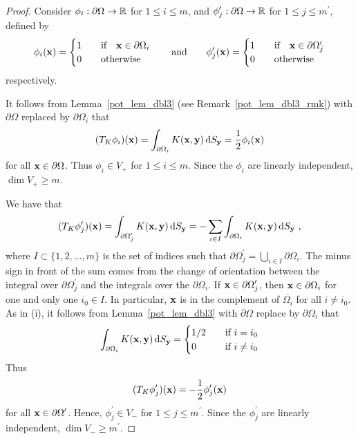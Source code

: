 \begin{proof}
Consider $\phi_i : \partial \Omega \rightarrow \mathbb{R}$ for $1\leq i \leq m$, and
$\displaystyle \phi_j^{\prime} : \partial \Omega \rightarrow \mathbb{R}$ for
$\displaystyle 1\leq j \leq m^{\prime}$, defined by
\begin{equation} \label{pot_phiI_phiJc}
\phi_i(\mathbf{x}) =
\begin{cases}
1 & \quad \text{if} \quad \mathbf{x} \in \partial \Omega_i \\
0 & \quad \text{otherwise}
\end{cases}
\qquad \text{and} \qquad
\phi_j^{\prime}(\mathbf{x}) =
\begin{cases}
1 & \quad \text{if} \quad \mathbf{x} \in \partial \Omega_j^{\prime} \\
0 & \quad \text{otherwise}
\end{cases}
\end{equation}
respectively.

 It follows from Lemma~\ref{pot_lem_dbl3} (see
Remark~\ref{pot_lem_dbl3_rmk}) with
$\partial \Omega$ replaced by $\partial \Omega_i$ that
\[
(T_K \phi_i)(\mathbf{x}) = \int_{\partial \Omega_i} K(\mathbf{x},\mathbf{y})
\,\mathrm{d}{S}_{\mathbf{y}} = \frac{1}{2} \phi_i(\mathbf{x})
\]
for all $\mathbf{x} \in \partial \Omega$.
Thus $\phi_i \in V_+$ for $1 \leq i \leq m$.  Since the $\phi_i$
are linearly independent, $\dim V_+ \geq m$.

 We have that
\[
(T_K \phi_j^{\prime})(\mathbf{x})
= \int_{\partial \Omega_j^{\prime}} K(\mathbf{x},\mathbf{y}) \,\mathrm{d}{S}_{\mathbf{y}}
= - \sum_{i\in I} \int_{\partial \Omega_i} K(\mathbf{x},\mathbf{y}) \,\mathrm{d}{S}_{\mathbf{y}} \ ,
\]
where $I\subset \{1,2,\ldots, m\}$ is the set of indices such that
$\displaystyle \partial \Omega_j^{\prime} = \bigcup_{i\in I} \partial \Omega_i$.
The minus sign in front of the sum comes from the change of orientation
between the integral over $\displaystyle \partial \Omega_j^{\prime}$
and the integrals over the $\partial \Omega_i$.
If $\displaystyle \mathbf{x} \in \partial \Omega_j^{\prime}$, then
$\mathbf{x} \in \partial \Omega_i$ for one and only one $i_0 \in I$.  In
particular, $\mathbf{x}$ is in the complement of $\overline{\Omega_i}$
for all $i \neq i_0$.  As in (i), it follows from
Lemma~\ref{pot_lem_dbl3} with
$\partial \Omega$ replace by $\partial \Omega_{i}$ that
\[
\int_{\partial \Omega_i} K(\mathbf{x},\mathbf{y}) \,\mathrm{d}{S}_{\mathbf{y}} =
\begin{cases}
1/2 & \quad \text{if} \ i = i_0 \\
0 & \quad \text{if} \ i \neq i_0
\end{cases}
\]
Thus
\[
  (T_K \phi_j^{\prime})(\mathbf{x}) = - \frac{1}{2} \phi_j^{\prime}(\mathbf{x})
\]
for all $\displaystyle \mathbf{x} \in \partial \Omega^{\prime}$.
Hence, $\displaystyle \phi_j^{\prime} \in V_-$ for
$\displaystyle 1 \leq j \leq m^{\prime}$.
Since the $\displaystyle \phi_j^{\prime}$ are linearly independent,
$\displaystyle \dim V_- \geq m^{\prime}$.


\end{proof}
